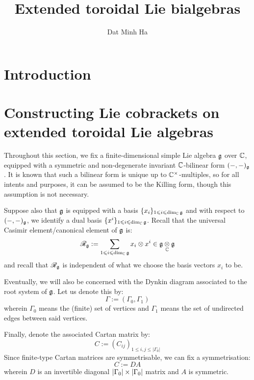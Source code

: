 

\setcounter{section}{-1}





    \title{Extended toroidal Lie bialgebras}
    
    \author{Dat Minh Ha}
    \maketitle
    
    \begin{abstract}
        
    \end{abstract}
    
    {
    \hypersetup{} 
    \tableofcontents %
    \listoftodos
    }

    \section{Introduction}

    \section{Constructing Lie cobrackets on extended toroidal Lie algebras}
        \begin{convention} \label{conv: a_fixed_finite_dimensional_simple_lie_algebra}
            Throughout this section, we fix a finite-dimensional simple Lie algebra $\mathfrak{g}$ over $\mathbb{C}$, equipped with a symmetric and non-degenerate invariant $\mathbb{C}$-bilinear form $(-, -)_{\mathfrak{g}}$. It is known that such a bilinear form is unique up to $\bbC^{\x}$-multiples, so for all intents and purposes, it can be assumed to be the Killing form, though this assumption is not necessary. 

            Suppose also that $\mathfrak{g}$ is equipped with a basis $\{x_i\}_{1 \leqslant i \leqslant \dim_{\mathbb{C}} \mathfrak{g}}$ and with respect to $(-, -)_{\mathfrak{g}}$, we identify a dual basis $\{x^i\}_{1 \leqslant i \leqslant \dim_{\mathbb{C}} \mathfrak{g}}$. Recall that the universal Casimir element/canonical element of $\mathfrak{g}$ is:
                $$\scrR_{\g} := \sum_{1 \leq i \leq \dim_{\bbC} \g} x_i \tensor x^i \in \g \tensor_{\bbC} \g$$
            and recall that $\mathscr{R}_{\mathfrak{g}}$ is independent of what we choose the basis vectors $x_i$ to be.

            Eventually, we will also be concerned with the Dynkin diagram associated to the root system of $\mathfrak{g}$. Let us denote this by:
                $$\Gamma := (\Gamma_0, \Gamma_1)$$
            wherein $\Gamma_0$ means the (finite) set of vertices and $\Gamma_1$ means the set of undirected edges between said vertices. 

            Finally, denote the associated Cartan matrix by:
                $$C := (C_{ij})_{1 \leq i, j \leq |\Gamma_0|}$$
            Since finite-type Cartan matrices are symmetrisable, we can fix a symmetrisation:
                $$C := D A$$
            wherein $D$ is an invertible diagonal $|\Gamma_0| \x |\Gamma_0|$ matrix and $A$ is symmetric. 
        \end{convention}


